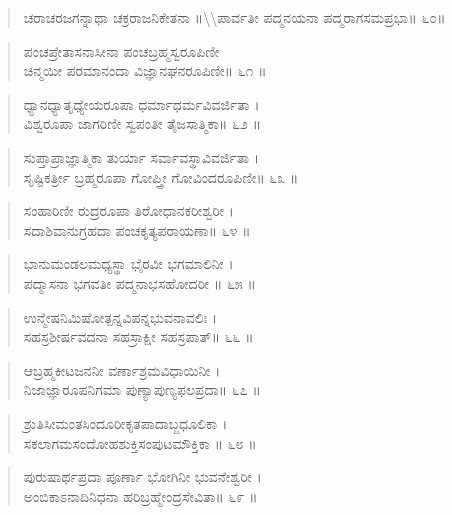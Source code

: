 \begin{verse}
ಚರಾಚರಜಗನ್ನಾಥಾ ಚಕ್ರರಾಜನಿಕೇತನಾ \num{॥\\ಪಾರ್ವತೀ ಪದ್ಮನಯನಾ ಪದ್ಮರಾಗಸಮಪ್ರಭಾ॥ ೬೦॥}
\end{verse}

\begin{verse}
ಪಂಚಪ್ರೇತಾಸನಾಸೀನಾ ಪಂಚಬ್ರಹ್ಮಸ್ವರೂಪಿಣೀ \\ಚಿನ್ಮಯೀ ಪರಮಾನಂದಾ ವಿಜ್ಞಾನಘನರೂಪಿಣೀ\num{॥ ೬೧ ॥}
\end{verse}

\begin{verse}
ಧ್ಯಾನಧ್ಯಾತೃಧ್ಯೇಯರೂಪಾ ಧರ್ಮಾಧರ್ಮವಿವರ್ಜಿತಾ ।\\ವಿಶ್ವರೂಪಾ ಜಾಗರಿಣೀ ಸ್ವಪಂತೀ ತೈಜಸಾತ್ಮಿಕಾ\num{॥ ೬೨ ॥}
\end{verse}

\begin{verse}
ಸುಪ್ತಾಪ್ರಾಜ್ಞಾತ್ಮಿಕಾ ತುರ್ಯಾ ಸರ್ವಾವಸ್ಥಾವಿವರ್ಜಿತಾ ।\\ಸೃಷ್ಟಿಕರ್ತ್ರೀ ಬ್ರಹ್ಮರೂಪಾ ಗೋಪ್ತ್ರೀ ಗೋವಿಂದರೂಪಿಣೀ\num{॥ ೬೩ ॥}
\end{verse}

\begin{verse}
ಸಂಹಾರಿಣೀ ರುದ್ರರೂಪಾ ತಿರೋಧಾನಕರೀಶ್ವರೀ ।\\ಸದಾಶಿವಾನುಗ್ರಹದಾ ಪಂಚಕೃತ್ಯಪರಾಯಣಾ\num{॥ ೬೪ ॥}
\end{verse}

\begin{verse}
ಭಾನುಮಂಡಲಮಧ್ಯಸ್ಥಾ ಭೈರವೀ ಭಗಮಾಲಿನೀ ।\\ಪದ್ಮಾಸನಾ ಭಗವತೀ ಪದ್ಮನಾಭಸಹೋದರೀ \num{॥ ೬೫ ॥}
\end{verse}

\begin{verse}
ಉನ್ಮೇಷನಿಮಿಷೋತ್ಪನ್ನವಿಪನ್ನಭುವನಾವಲಿಃ ।\\ಸಹಸ್ರಶೀರ್ಷವದನಾ ಸಹಸ್ರಾಕ್ಷೀ ಸಹಸ್ರಪಾತ್\num{॥ ೬೬ ॥}
\end{verse}

\begin{verse}
ಆಬ್ರಹ್ಮಕೀಟಜನನೀ ವರ್ಣಾಶ್ರಮವಿಧಾಯಿನೀ ।\\ನಿಜಾಜ್ಞಾರೂಪನಿಗಮಾ ಪುಣ್ಯಾಪುಣ್ಯಫಲಪ್ರದಾ\num{॥ ೬೭ ॥}
\end{verse}

\begin{verse}
ಶ್ರುತಿಸೀಮಂತಸಿಂದೂರೀಕೃತಪಾದಾಬ್ಜಧೂಲಿಕಾ ।\\ಸಕಲಾಗಮಸಂದೋಹಶುಕ್ತಿಸಂಪುಟಮೌಕ್ತಿಕಾ \num{॥ ೬೮ ॥}
\end{verse}

\begin{verse}
ಪುರುಷಾರ್ಥಪ್ರದಾ ಪೂರ್ಣಾ ಭೋಗಿನೀ ಭುವನೇಶ್ವರೀ ।\\ಅಂಬಿಕಾಽನಾದಿನಿಧನಾ ಹರಿಬ್ರಹ್ಮೇಂದ್ರಸೇವಿತಾ\num{॥ ೬೯ ॥}
\end{verse}


